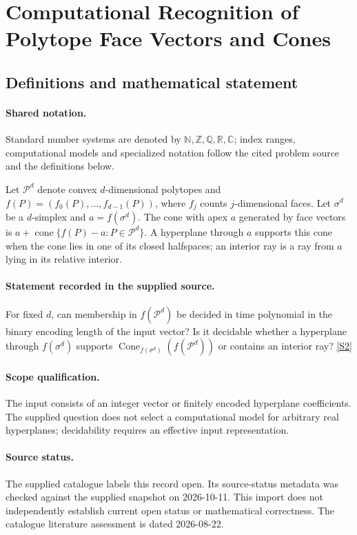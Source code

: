 \documentclass[11pt]{article}
\newcommand{\sref}[2]{\hyperlink{source:#1:#2}{[S#2]}}
\begin{document}
\section{Computational Recognition of Polytope Face Vectors and Cones}\label{statement}

\subsection{Definitions and mathematical statement}

\paragraph{Shared notation.}Standard number systems are denoted by $\mathbb N,\mathbb Z,\mathbb Q,\mathbb R,\mathbb C$; index ranges, computational models and specialized notation follow the cited problem source and the definitions below.


Let $\mathcal P^d$ denote convex $d$-dimensional polytopes and $f(P)=(f_0(P),\ldots,f_{d-1}(P))$, where $f_j$ counts $j$-dimensional faces. Let $\sigma^d$ be a $d$-simplex and $a=f(\sigma^d)$. The cone with apex $a$ generated by face vectors is $a+\operatorname{cone}\{f(P)-a:P\in\mathcal P^d\}$. A hyperplane through $a$ supports this cone when the cone lies in one of its closed halfspaces; an interior ray is a ray from $a$ lying in its relative interior.
\paragraph{Statement recorded in the supplied source.}
For fixed $d$, can membership in $f(\mathcal P^d)$ be decided in time polynomial in the binary encoding length of the input vector? Is it decidable whether a hyperplane through $f(\sigma^d)$ supports $\operatorname{Cone}_{f(\sigma^d)}(f(\mathcal P^d))$ or contains an interior ray? \sref{statement}{2}
\paragraph{Scope qualification.}
The input consists of an integer vector or finitely encoded hyperplane coefficients. The supplied question does not select a computational model for arbitrary real hyperplanes; decidability requires an effective input representation.
\paragraph{Source status.}
The supplied catalogue labels this record open. Its source-status metadata was checked against the supplied snapshot on 2026-10-11. This import does not independently establish current open status or mathematical correctness. The catalogue literature assessment is dated 2026-08-22.
\end{document}
